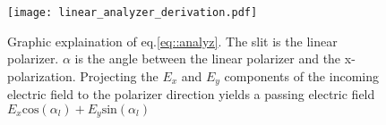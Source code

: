 \documentclass{article}
\begin{document}
\begin{figure}
\begin{center}
  \texttt{[image: linear\_analyzer\_derivation.pdf]} 
   \caption{Graphic explaination of eq.\ref{eq::analyz}. The slit is the linear polarizer. $\alpha$ is the angle between the linear polarizer and the x-polarization. Projecting the $E_x$ and $E_y$ components of the incoming electric field to the polarizer direction yields a passing electric field $E_x\text{cos}(\alpha_l)+E_y\text{sin}(\alpha_l)$ }
\label{analyzer}
\label{fig::analyzer}
\end{center}
\end{figure}
\end{document}

